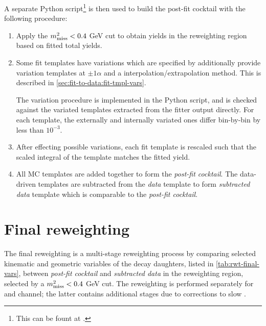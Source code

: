 A separate Python script\footnote{
    This can be fount at .
} is then used to build the post-fit cocktail with the following procedure:
\begin{enumerate}
    \item Apply the $m^2_\text{miss} < 0.4$ GeV cut to obtain yields in the reweighting
        region based on fitted total yields.

    \item Some fit templates have variations which are specified by
        additionally provide variation templates at $\pm 1 \alpha$ and a
        interpolation/extrapolation method.
        This is described in \cref{sec:fit-to-data:fit-tmpl-vars}.

        The variation procedure is implemented in the Python script,
        and is checked against the variated templates extracted from the
        fitter output directly.
        For each template, the externally and internally variated ones differ
        bin-by-bin by less than $10^{-3}$.

    \item After effecting possible variations,
        each fit template is rescaled such that the scaled integral of the
        template matches the fitted yield.

    \item All MC templates are added together to form the
        \emph{post-fit cocktail}.
        The data-driven templates are subtracted from the \emph{data}
        template to form \emph{subtracted data} template
        which is comparable to the \emph{post-fit cocktail}.
\end{enumerate}


\section{Final reweighting}
\label{sec:data-mc:final-rwt}

The final reweighting is a multi-stage reweighting process by comparing
selected
kinematic and geometric variables of the \B decay daughters,
listed in \cref{tab:rwt-final-vars},
between \emph{post-fit cocktail} and \emph{subtracted data}
in the reweighting region, selected by a $m^2_\text{miss} < 0.4$ GeV cut.
The reweighting is performed separately for \Dz and \Dstar channel;
the latter contains additional stages due to corrections to slow \pion.

